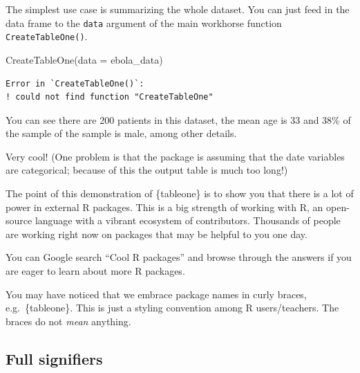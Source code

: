 \documentclass[
  letterpaper,
  DIV=11,
  numbers=noendperiod]{scrreprt}
\newenvironment{Shaded}{\begin{snugshade}}{\end{snugshade}}
\newcommand{\AttributeTok}[1]{\textcolor[rgb]{0.40,0.45,0.13}{#1}}
\newcommand{\FunctionTok}[1]{\textcolor[rgb]{0.28,0.35,0.67}{#1}}
\newcommand{\NormalTok}[1]{\textcolor[rgb]{0.00,0.23,0.31}{#1}}
\begin{document}
The simplest use case is summarizing the whole dataset. You can just
feed in the data frame to the \texttt{data} argument of the main
workhorse function \texttt{CreateTableOne()}.

\begin{Shaded}
\begin{Highlighting}[]
\FunctionTok{CreateTableOne}\NormalTok{(}\AttributeTok{data =}\NormalTok{ ebola\_data)}
\end{Highlighting}
\end{Shaded}

\begin{verbatim}
Error in `CreateTableOne()`:
! could not find function "CreateTableOne"
\end{verbatim}

You can see there are 200 patients in this dataset, the mean age is 33
and 38\% of the sample of the sample is male, among other details.

Very cool! (One problem is that the package is assuming that the date
variables are categorical; because of this the output table is much too
long!)

The point of this demonstration of \{tableone\} is to show you that
there is a lot of power in external R packages. This is a big strength
of working with R, an open-source language with a vibrant ecosystem of
contributors. Thousands of people are working right now on packages that
may be helpful to you one day.

You can Google search ``Cool R packages'' and browse through the answers
if you are eager to learn about more R packages.

\begin{tcolorbox}[enhanced jigsaw, title=\textcolor{quarto-callout-note-color}{\faInfo}\hspace{0.5em}{Side Note}, colbacktitle=quarto-callout-note-color!10!white, leftrule=.75mm, arc=.35mm, opacityback=0, bottomrule=.15mm, rightrule=.15mm, toptitle=1mm, breakable, toprule=.15mm, colback=white, coltitle=black, colframe=quarto-callout-note-color-frame, bottomtitle=1mm, titlerule=0mm, left=2mm, opacitybacktitle=0.6]

You may have noticed that we embrace package names in curly braces,
e.g.~\{tableone\}. This is just a styling convention among R
users/teachers. The braces do not \emph{mean} anything.

\end{tcolorbox}

\subsection{Full signifiers}\label{full-signifiers}
\end{document}
